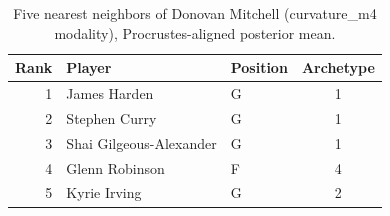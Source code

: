 \begin{table}[htbp]
  \centering\small
  \begin{tabular}{rllc}
    \toprule
    Rank & Player & Position & Archetype \\
    \midrule
    1 & James Harden & G & 1 \\
    2 & Stephen Curry & G & 1 \\
    3 & Shai Gilgeous-Alexander & G & 1 \\
    4 & Glenn Robinson & F & 4 \\
    5 & Kyrie Irving & G & 2 \\
    \bottomrule
  \end{tabular}
  \caption{Five nearest neighbors of Donovan Mitchell (curvature_m4 modality), Procrustes-aligned posterior mean.}
  \label{tab:Donovan_Mitchell_neighbors_curvature_m4}
\end{table}

